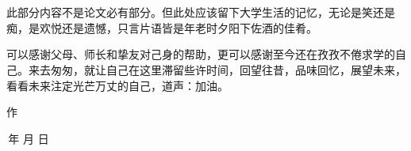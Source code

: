 \section*{}
\bigskip
    此部分内容不是论文必有部分。但此处应该留下大学生活的记忆，无论是笑还是痴，是欢悦还是遗憾，只言片语皆是年老时夕阳下佐酒的佳肴。

    可以感谢父母、师长和挚友对己身的帮助，更可以感谢至今还在孜孜不倦求学的自己。来去匆匆，就让自己在这里滞留些许时间，回望往昔，品味回忆，展望未来，看看未来注定光芒万丈的自己，道声：加油。\bigskip

    \mbox{}\hfill\ifanonymous 作\else \authorname\fi\qquad\quad\mbox{}\bigskip

    \mbox{}\hfill\number\year\,年\,\number\month\,月\,\number\day\,日\quad

